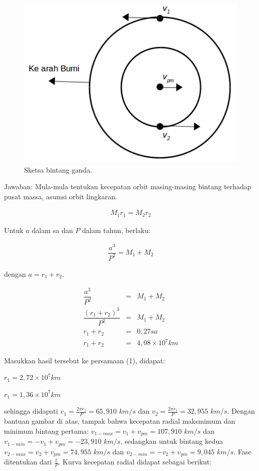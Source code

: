 \documentclass[11pt,fleqn]{exam}
\begin{document}
\begin{questions}
\begin{figure}[H]
\centering
\includegraphics[scale=0.55]{bintang-ganda.png}
\caption{Sketsa bintang ganda.}
\end{figure}

Jawaban:
Mula-mula tentukan kecepatan orbit masing-masing bintang terhadap pusat massa, asumsi orbit lingkaran.

\begin{eqnarray}
M_1 r_1=M_2 r_2
\end{eqnarray}

Untuk $a$ dalam sa dan $P$ dalam tahun, berlaku:

\begin{eqnarray}
\dfrac{a^3}{P^2}=M_1+M_2
\end{eqnarray}

dengan $a=r_1+r_2$.

\begin{eqnarray*}
\dfrac{a^3}{P^2}&=&M_1+M_2\\
\dfrac{(r_1+r_2)^3}{P^2}&=&M_1+M_2\\
r_1+r_2&=&0,27 sa\\
r_1+r_2&=&4,08\times10^7 km
\end{eqnarray*}

Masukkan hasil tersebut ke persamaan (1), didapat:

$r_1=2,72\times10^7 km$

$r_1=1,36\times10^7 km$

sehingga didapati $v_1=\frac{2\pi r_1}{P}=65,910$ $km/s$ dan $v_2=\frac{2\pi r_1}{P}=32,955$ $km/s$. Dengan bantuan gambar di atas, tampak bahwa kecepatan radial maksmimum dan minimum bintang pertama: $v_{1-max}=v_1+v_{pm}=107,910$ $km/s$ dan $v_{1-min}=-v_1+v_{pm}= -23,910$ $km/s$, sedangkan untuk bintang kedua $v_{2-max}=v_2+v_{pm}=74,955$ $km/s$ dan $v_{2-min}=-v_2+v_{pm}= 9,045$ $km/s$. Fase ditentukan dari $\frac{t}{P}$. Kurva kecepatan radial didapat sebagai berikut:


\end{questions}
\end{document}
